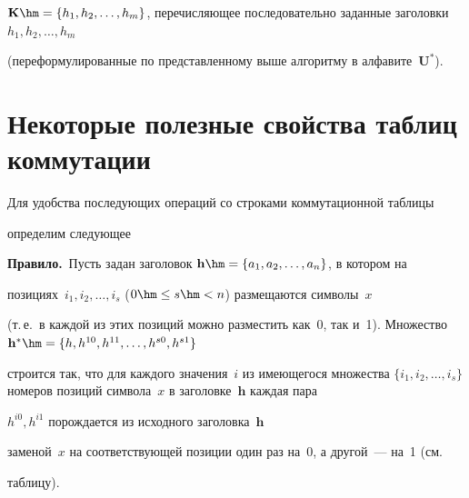 $\mathbf{K}\hm = \{h_1, 

h_2, \ldots , h_m\}$, перечисляющее последовательно заданные заголовки~$h_1, h_2, \ldots , h_m$ 

(переформулированные по представленному выше алгоритму в алфавите~$\mathbf{U}^*$).

    



\section{Некоторые полезные свойства таблиц коммутации}



     Для удобства последующих операций со строками коммутационной таблицы 

определим следующее

     

     \medskip

     

     \noindent

\textbf{Правило.}\ Пусть задан заголовок $\mathbf{h}\hm =\{a_1, a_2, \ldots , a_n\}$, в котором на 

позициях~$i_1, i_2, \ldots , i_s$ ($0 \hm\leq  s \hm<n$) размещаются символы~${x}$ 

(т.\,е.\ в каждой из этих позиций можно разместить как~0, так и~1). Множество $\mathbf{h}^*\hm = 

\{{h}, {h}^{10}, {h}^{11}, \ldots , {h}^{s0}, {h}^{s1}\}$ 

строится так, что для каждого значения~$i$ из имеющегося множества $\{i_1, i_2, \ldots , 

i_s\}$ номеров позиций символа~${x}$ в заголовке~$\mathbf{h}$ каждая пара 

${h}^{i0}, {h}^{i1}$ порождается из исходного заголовка~$\mathbf{h}$ 

заменой~${x}$ на соответствующей позиции один раз на~0, а другой~--- на~1 (см.\ 

таблицу).




